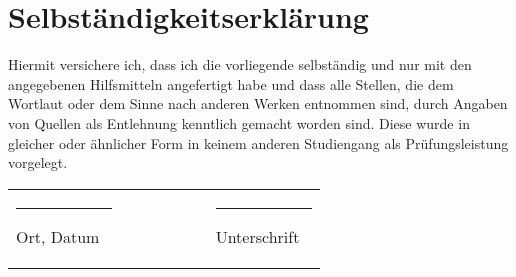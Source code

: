 \cleardoublepage
\thispagestyle{empty}
\section*{Selbständigkeitserklärung}

Hiermit versichere ich, dass ich die vorliegende {\thethesistype} 
selbständig und nur mit den angegebenen Hilfsmitteln angefertigt habe und dass alle Stellen, die dem Wortlaut oder dem 
Sinne nach anderen Werken entnommen sind, durch Angaben von Quellen als 
Entlehnung kenntlich gemacht worden sind. 
Diese {\thethesistype} wurde in gleicher oder ähnlicher Form in keinem anderen Studiengang als Prüfungs\-leistung vorgelegt. 

\vspace{3cm}

\begin{center}
\begin{tabular}{p{0.32\linewidth}p{0.25\linewidth}p{0.32\linewidth}}
\hrule\vspace{0.2cm}
\centering Ort, Datum
& &  
\hrule\vspace{0.2cm}
\centering Unterschrift 
\end{tabular}
\end{center}